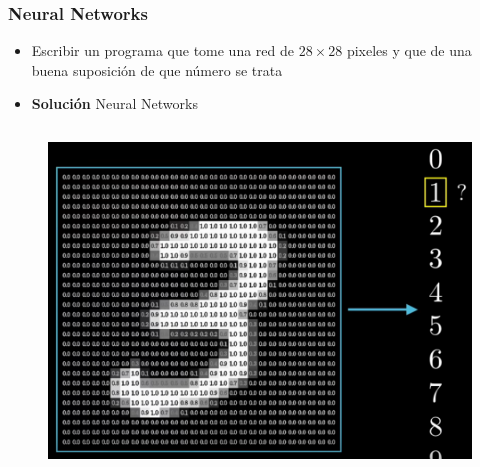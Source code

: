 \documentclass[10pt]{beamer}
\begin{document}
\begin{frame}
\frametitle{Neural Networks}
\begin{beamerboxesrounded}[upper=uppercolor, lower=lowercolor, shadow=true]{} 

\begin{itemize}
 \item Escribir un programa que tome una red de $28\times 28$ pixeles y que de una buena suposici\'on de que n\'umero se trata
 \item \textbf{Soluci\'on} Neural Networks
    
\end{itemize}
\end{beamerboxesrounded}

\begin{columns}
\begin{column}{\textwidth}
 \begin{figure}
 \begin{center}
 \includegraphics[scale=0.2]{./Figures/tres_grid.png} 
 \end{center}
 \end{figure}  
\end{column}%

\end{columns}

\end{frame}
\end{document}
